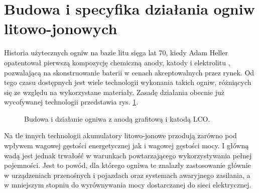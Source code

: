 \documentclass[polish,engineer]{polsl-msth}
\begin{document}
\section{Budowa i specyfika działania ogniw litowo-jonowych}
Historia użytecznych ogniw na bazie litu sięga lat 70, kiedy Adam Heller opatentował pierwszą kompozycję chemiczną anody, katody i elektrolitu \cite{heller1975electrochemical}, pozwalającą na skonstruowanie baterii w cenach akceptowalnych przez rynek. Od tego czasu dostępnych jest wiele technologii wykonania takich ogniw, różniących się ze względu na wykorzystane materiały. Zasadę działania obecnie już wycofywanej technologii przedstawia rys. \ref{img:liion_structure}.
\begin{figure}[hbtp]
\centering
     \caption{Budowa i działanie ogniwa z anodą grafitową i katodą LCO. \cite{liionpic_wikimedia}  \label{img:liion_structure}}
\end{figure}
Na tle innych technologii akumulatory litowo-jonowe przodują zarówno pod wpływem wagowej gęstości energetycznej jak i wagowej gęstości mocy. I główną wadą jest jednak trwałość w warunkach powtarzającego wykorzystywania pełnej pojemności. \cite{IBRAHIM20081221} Jest to powód, dla którego ogniwa te znalazły zastosowanie głównie w urządzeniach przenośnych i pojazdach oraz systemach awaryjnego zasilania, a w mniejszym stopniu do wyrównywania mocy dostarczanej do sieci elektrycznej.
\end{document}
